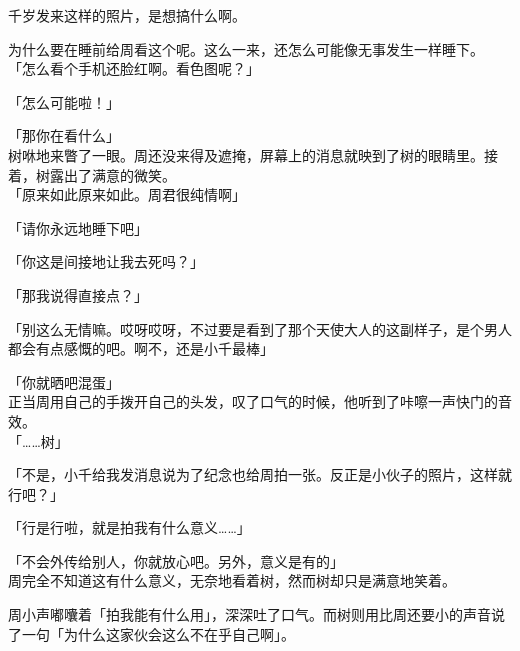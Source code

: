 千岁发来这样的照片，是想搞什么啊。

为什么要在睡前给周看这个呢。这么一来，还怎么可能像无事发生一样睡下。\\

「怎么看个手机还脸红啊。看色图呢？」

「怎么可能啦！」

「那你在看什么」\\

树咻地来瞥了一眼。周还没来得及遮掩，屏幕上的消息就映到了树的眼睛里。接着，树露出了满意的微笑。\\

「原来如此原来如此。周君很纯情啊」

「请你永远地睡下吧」

「你这是间接地让我去死吗？」

「那我说得直接点？」

「别这么无情嘛。哎呀哎呀，不过要是看到了那个天使大人的这副样子，是个男人都会有点感慨的吧。啊不，还是小千最棒」

「你就晒吧混蛋」\\

正当周用自己的手拨开自己的头发，叹了口气的时候，他听到了咔嚓一声快门的音效。\\

「……树」

「不是，小千给我发消息说为了纪念也给周拍一张。反正是小伙子的照片，这样就行吧？」

「行是行啦，就是拍我有什么意义……」

「不会外传给别人，你就放心吧。另外，意义是有的」\\

周完全不知道这有什么意义，无奈地看着树，然而树却只是满意地笑着。

周小声嘟囔着「拍我能有什么用」，深深吐了口气。而树则用比周还要小的声音说了一句「为什么这家伙会这么不在乎自己啊」。
